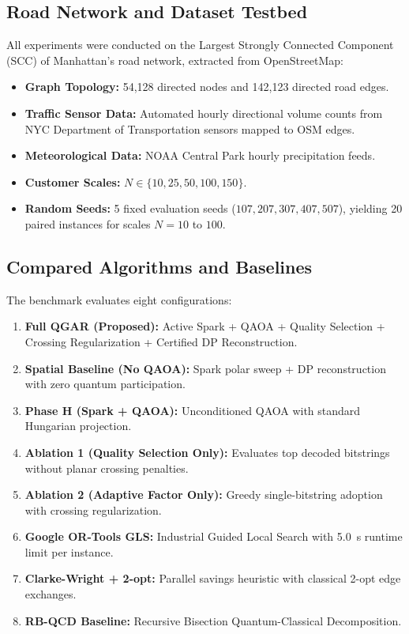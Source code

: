 \documentclass[journal,10pt]{IEEEtran}
\begin{document}
\subsection{Road Network and Dataset Testbed}
All experiments were conducted on the Largest Strongly Connected Component (SCC) of Manhattan's road network, extracted from OpenStreetMap:
\begin{itemize}
    \item \textbf{Graph Topology:} 54,128 directed nodes and 142,123 directed road edges.
    \item \textbf{Traffic Sensor Data:} Automated hourly directional volume counts from NYC Department of Transportation sensors mapped to OSM edges.
    \item \textbf{Meteorological Data:} NOAA Central Park hourly precipitation feeds.
    \item \textbf{Customer Scales:} $N \in \{10, 25, 50, 100, 150\}$.
    \item \textbf{Random Seeds:} 5 fixed evaluation seeds ($107, 207, 307, 407, 507$), yielding 20 paired instances for scales $N=10$ to $100$.
\end{itemize}

\subsection{Compared Algorithms and Baselines}
The benchmark evaluates eight configurations:
\begin{enumerate}
    \item \textbf{Full QGAR (Proposed):} Active Spark + QAOA + Quality Selection + Crossing Regularization + Certified DP Reconstruction.
    \item \textbf{Spatial Baseline (No QAOA):} Spark polar sweep + DP reconstruction with zero quantum participation.
    \item \textbf{Phase H (Spark + QAOA):} Unconditioned QAOA with standard Hungarian projection.
    \item \textbf{Ablation 1 (Quality Selection Only):} Evaluates top decoded bitstrings without planar crossing penalties.
    \item \textbf{Ablation 2 (Adaptive Factor Only):} Greedy single-bitstring adoption with crossing regularization.
    \item \textbf{Google OR-Tools GLS:} Industrial Guided Local Search with 5.0~s runtime limit per instance.
    \item \textbf{Clarke-Wright + 2-opt:} Parallel savings heuristic with classical 2-opt edge exchanges.
    \item \textbf{RB-QCD Baseline:} Recursive Bisection Quantum-Classical Decomposition.
\end{enumerate}
\end{document}
